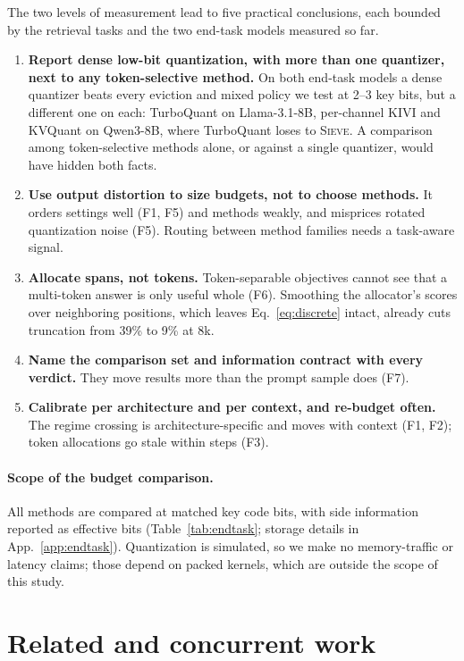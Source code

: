 \documentclass{article}
\newcommand{\sieve}{\textsc{Sieve}}
\theoremstyle{definition}
\begin{document}
The two levels of measurement lead to five practical conclusions, each bounded by the retrieval tasks and the two end-task models measured so far.
\begin{enumerate}[leftmargin=*,itemsep=1pt,topsep=2pt]
  \item \textbf{Report dense low-bit quantization, with more than one quantizer, next to any token-selective method.}  On both end-task models a dense quantizer beats every eviction and mixed policy we test at 2--3 key bits, but a different one on each: TurboQuant on Llama-3.1-8B, per-channel KIVI and KVQuant on Qwen3-8B, where TurboQuant loses to \sieve{}.  A comparison among token-selective methods alone, or against a single quantizer, would have hidden both facts.
  \item \textbf{Use output distortion to size budgets, not to choose methods.}  It orders settings well (F1, F5) and methods weakly, and misprices rotated quantization noise (F5).  Routing between method families needs a task-aware signal.
  \item \textbf{Allocate spans, not tokens.}  Token-separable objectives cannot see that a multi-token answer is only useful whole (F6).  Smoothing the allocator's scores over neighboring positions, which leaves Eq.~\ref{eq:discrete} intact, already cuts truncation from 39\% to 9\% at 8k.
  \item \textbf{Name the comparison set and information contract with every verdict.}  They move results more than the prompt sample does (F7).
  \item \textbf{Calibrate per architecture and per context, and re-budget often.}  The regime crossing is architecture-specific and moves with context (F1, F2); token allocations go stale within steps (F3).
\end{enumerate}

\paragraph{Scope of the budget comparison.}  All methods are compared at matched key code bits, with side information reported as effective bits (Table~\ref{tab:endtask}; storage details in App.~\ref{app:endtask}).  Quantization is simulated, so we make no memory-traffic or latency claims; those depend on packed kernels, which are outside the scope of this study.

\section{Related and concurrent work}
\label{sec:related}
\end{document}

